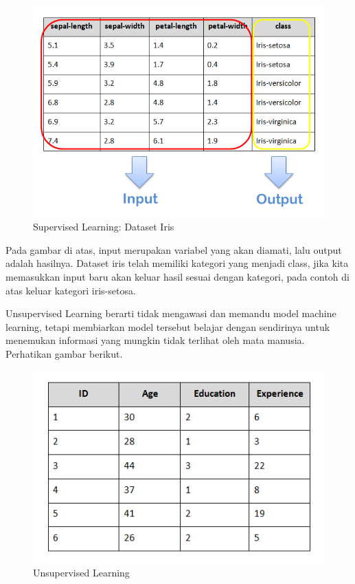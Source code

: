 \begin{figure}[H]
    \centering
    \includegraphics[width=12cm]{figures/chapter2/2.png}
    \caption{Supervised Learning: Dataset Iris}
\end{figure}

\par Pada gambar di atas, input merupakan variabel yang akan diamati, lalu output adalah hasilnya. Dataset iris telah memiliki kategori yang menjadi class, jika kita memasukkan input baru akan keluar hasil sesuai dengan kategori, pada contoh di atas keluar kategori iris-setosa.

\par Unsupervised Learning berarti tidak mengawasi dan memandu model machine learning, tetapi membiarkan model tersebut belajar dengan sendirinya untuk menemukan informasi yang mungkin tidak terlihat oleh mata manusia. Perhatikan gambar berikut.

\begin{figure}[H]
    \centering
    \includegraphics[width=12cm]{figures/chapter2/3.png}
    \caption{Unsupervised Learning}
\end{figure}

